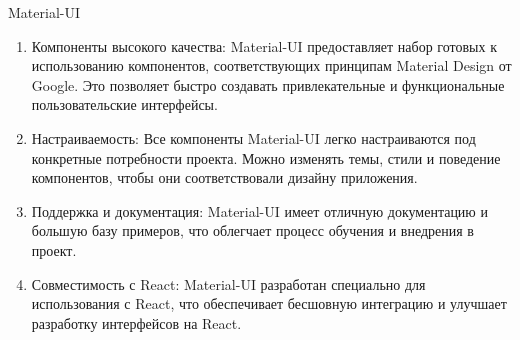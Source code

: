 Material-UI
\begin{enumerate}
    \item Компоненты высокого качества: Material-UI предоставляет набор готовых к использованию компонентов, соответствующих принципам Material Design от Google.
    Это позволяет быстро создавать привлекательные и функциональные пользовательские интерфейсы.

    \item Настраиваемость: Все компоненты Material-UI легко настраиваются под конкретные потребности проекта.
    Можно изменять темы, стили и поведение компонентов, чтобы они соответствовали дизайну приложения.

    \item Поддержка и документация: Material-UI имеет отличную документацию и большую базу примеров, что облегчает процесс обучения и внедрения в проект.

    \item Совместимость с React: Material-UI разработан специально для использования с React, что обеспечивает бесшовную интеграцию и улучшает разработку интерфейсов на React.

\end{enumerate}